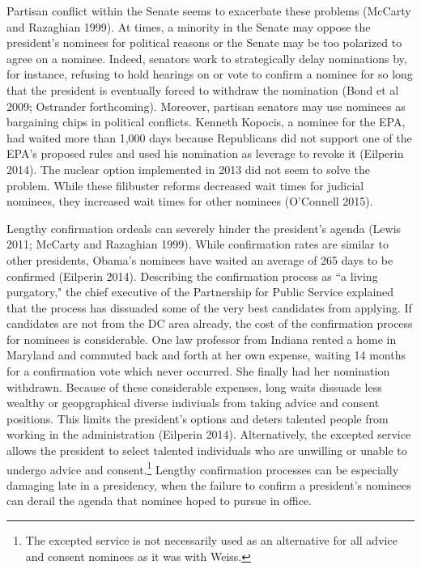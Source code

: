 \documentclass[12pt]{article}
\begin{document}
Partisan conflict within the Senate seems to exacerbate these problems (McCarty and Razaghian 1999). At times, a minority in the Senate may oppose the president's nominees for political reasons or the Senate may be too polarized to agree on a nominee. Indeed, senators work to strategically delay nominations by, for instance, refusing to hold hearings on or vote to confirm a nominee for so long that the president is eventually forced to withdraw the nomination (Bond et al 2009; Ostrander forthcoming). Moreover, partisan senators may use nominees as bargaining chips in political conflicts. Kenneth Kopocis, a nominee for the EPA, had waited more than 1,000 days because Republicans did not support one of the EPA's proposed rules and used his nomination as leverage to revoke it (Eilperin 2014). The nuclear option implemented in 2013 did not seem to solve the problem. While these filibuster reforms decreased wait times for judicial nominees, they increased wait times for other nominees (O'Connell 2015). 

Lengthy confirmation ordeals can severely hinder the president's agenda (Lewis 2011; McCarty and Razaghian 1999). While confirmation rates are similar to other presidents, Obama's nominees have waited an average of 265 days to be confirmed (Eilperin 2014). Describing the confirmation process as ``a living purgatory," the chief executive of the Partnership for Public Service explained that the process has dissuaded some of the very best candidates from applying. If candidates are not from the DC area already, the cost of the confirmation process for nominees is considerable. One law professor from Indiana rented a home in Maryland and commuted back and forth at her own expense, waiting 14 months for a confirmation vote which never occurred. She finally had her nomination withdrawn. Because of these considerable expenses, long waits dissuade less wealthy or geopgraphical diverse indiviuals from taking advice and consent positions. This limits the president's options and deters talented people from working in the administration (Eilperin 2014). Alternatively, the excepted service allows the president to select talented individuals who are unwilling or unable to undergo advice and consent.\footnote{The excepted service is not necessarily used as an alternative for all advice and consent nominees as it was with Weiss.} Lengthy confirmation processes can be especially damaging late in a presidency, when the failure to confirm a president's nominees can derail the agenda that nominee hoped to pursue in office.
\end{document}
